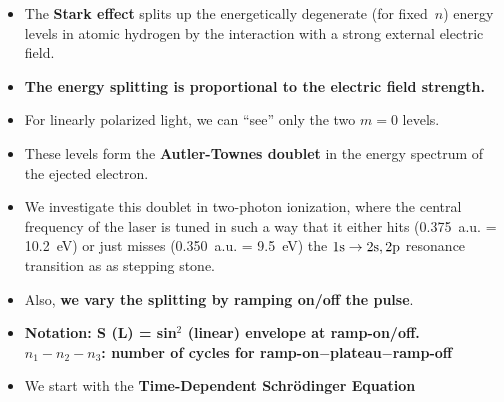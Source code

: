 \documentclass[landscape,a0b,final]{a0poster}
\newenvironment{poster}{
  \begin{center}
  \begin{minipage}[c]{0.98\textwidth}
}{
  \end{minipage} 
  \end{center}
}
\newcommand{\pbox}[4]{
\psshadowbox[#3]{
\begin{minipage}[t][#2][t]{#1}
#4
\end{minipage}
}}
\begin{document}
\begin{poster}
\begin{multicols}{3}
\begin{itemize}
\item The {\bf\color{red}Stark effect} splits up the energetically degenerate (for fixed~$n$) energy levels in atomic
      hydrogen by the interaction with a strong external electric field.
\item {\bf\color{newgreen}The energy splitting is proportional to the electric field strength.}
\item For linearly polarized light, we can ``see'' only the two $m=0$ levels.
\item These levels form the {\bf\color{violet}Autler-Townes doublet} in the energy spectrum
      of the ejected electron.
\item We investigate this doublet in two-photon ionization, where the central frequency
      of the laser is tuned in such a way that it either hits (0.375~a.u. = 10.2~eV) or just misses
      (0.350~a.u. = 9.5~eV) the $\rm 1s \to 2s,2p$ resonance transition as as stepping stone. 
\item Also, {\bf\color{newgreen} we vary the splitting by ramping on/off the pulse}. 
\item {\bf\color{red}Notation: S (L) = sin$^2$ (linear) envelope at ramp-on/off.  \\
\phantom{Notation:} $n_1 - n_2 - n_3$: number of cycles for ramp-on$-$plateau$-$ramp-off}  
\end{itemize} 

\vfill 
\columnbreak




\vspace{2cm}\begin{center}\pbox{0.8\columnwidth}{}{linewidth=2mm,framearc=0.1,linecolor=lightblue,fillstyle=gradient,
                          gradangle=0,gradbegin=whiteblue,gradend=whiteblue,gradmidpoint=1.0,framesep=1em}{\begin{center}{\Large\bf Numerical Method}\end{center}}\end{center}\vspace{0.375cm}

\begin{itemize}
\item We start with the {\bf\color{red}Time-Dependent Schr\"{o}dinger Equation}


\end{itemize}
\end{multicols}
\end{poster}
\end{document}
